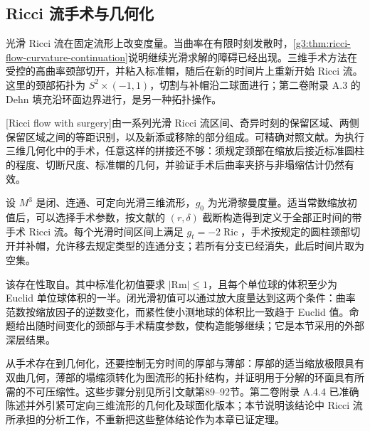 \subsection{Ricci 流手术与几何化}
\label{g3:subsec:2705:04}
光滑 Ricci 流在固定流形上改变度量。当曲率在有限时刻发散时，\cref{g3:thm:ricci-flow-curvature-continuation}说明继续光滑求解的障碍已经出现。三维手术方法在受控的高曲率颈部切开，并粘入标准帽，随后在新的时间片上重新开始 Ricci 流。这里的颈部拓扑为 \(S^2\times(-1,1)\)，切割与补帽沿二球面进行；第二卷附录 A.3 的 Dehn 填充沿环面边界进行，是另一种拓扑操作。

\ProseParagraphBreak
{}[Ricci flow with surgery]由一系列光滑 Ricci 流区间、奇异时刻的保留区域、两侧保留区域之间的等距识别，以及新添或移除的部分组成。可精确对照文献\cite[定义68.1，第2746--2747页；第73节]{KleinerLott2008Perelman}。为执行三维几何化中的手术，任意这样的拼接还不够：须规定颈部在缩放后接近标准圆柱的程度、切断尺度、标准帽的几何，并验证手术后曲率夹挤与非塌缩估计仍然有效。

\begin{theorem}\label{g3:thm:ricci-surgery-existence-external}
	设 \(M^3\) 是闭、连通、可定向光滑三维流形，\(g_0\) 为光滑黎曼度量。适当常数缩放初值后，可以选择手术参数，按文献的 \((r,\delta)\) 截断构造得到定义于全部正时间的带手术 Ricci 流。每个光滑时间区间上满足 \(g_t=-2\operatorname{Ric}\)，手术按规定的圆柱颈部切开并补帽，允许移去规定类型的连通分支；若所有分支已经消失，此后时间片取为空集。
\end{theorem}

该存在性取自\cite[定义77.1、命题77.2，第2770--2771页；证明见第78--80节]{KleinerLott2008Perelman}。其中标准化初值要求 \(|\mathrm{Rm}|\le1\)，且每个单位球的体积至少为 Euclid 单位球体积的一半。闭光滑初值可以通过放大度量达到这两个条件：曲率范数按缩放因子的逆数变化，而紧性使小测地球的体积比一致趋于 Euclid 值。命题给出随时间变化的颈部与手术精度参数，使构造能够继续；它是本节采用的外部深层结果。

\ProseParagraphBreak
从手术存在到几何化，还要控制无穷时间的厚部与薄部：厚部的适当缩放极限具有双曲几何，薄部的塌缩须转化为图流形的拓扑结构，并证明用于分解的环面具有所需的不可压缩性。这些步骤分别见所引文献第89--92节。第二卷附录 A.4.4 已准确陈述并外引紧可定向三维流形的几何化及球面化版本；本节说明该结论中 Ricci 流所承担的分析工作，不重新把这些整体结论作为本章已证定理。


